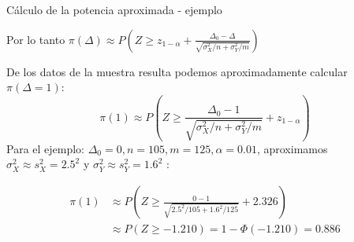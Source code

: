 \documentclass{beamer}
\theoremstyle{definition}
\begin{document}
\begin{frame}{\color{rosee}C\'alculo de la potencia aproximada - ejemplo}
\small

Por lo tanto $\pi(\Delta)\approx  P\left(Z \geq z_{1- \alpha}+\frac{\Delta_0-\Delta}{\sqrt{\sigma_X^2 / n+\sigma^2_Y / m}}\right)  $

De los datos de la muestra resulta podemos aproximadamente calcular $\pi(\Delta=1)$:     
$$
\pi(1) \approx P\left(Z \geq \frac{\Delta_0-1}{\sqrt{\sigma_X^2 / n+\sigma_Y^2 / m}} + z_{1- \alpha}\right)
$$
Para el ejemplo: $\Delta_0=0, n=105,m=125, \alpha=0.01$, aproximamos $\sigma_X^2\approx s_X^2=2.5^2$ y $\sigma_Y^2\approx s_Y^2=1.6^2$ :



\begin{align*}
\pi(1) & \approx P\left(Z\geq \frac{0-1}{\sqrt{2.5^2 /105+1.6^2 / 125}} + 2.326\right) \\
& \approx P\left(Z\geq -1.210\right) =1-\Phi(-1.210) =0.886
\end{align*}

\end{frame}
\end{document}

